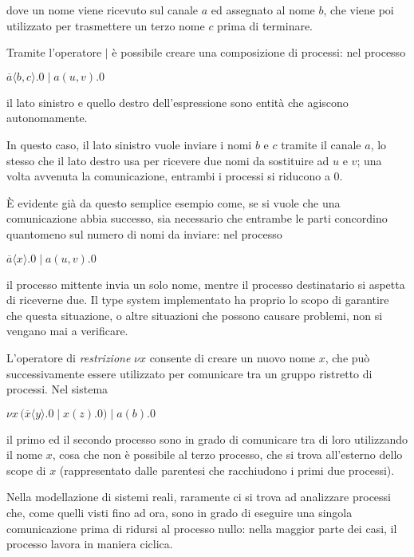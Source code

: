 dove un nome viene ricevuto sul canale $a$ ed assegnato al nome $b$, che
viene poi utilizzato per trasmettere un terzo nome $c$ prima di terminare.

Tramite l'operatore $|$ \`e possibile creare una composizione di processi:
nel processo

\begin{pilisting}
$
    \overline{a}\langle b,c\rangle.0 \; | \;
    a(u,v).0
$
\end{pilisting}

il lato sinistro e quello destro dell'espressione sono entit\`a che agiscono
autonomamente.

In questo caso, il lato sinistro vuole inviare i nomi $b$ e $c$ tramite il
canale $a$, lo stesso che il lato destro usa per ricevere due nomi da
sostituire ad $u$ e $v$; una volta avvenuta la comunicazione, entrambi i
processi si riducono a $0$.

\`E evidente gi\`a da questo semplice esempio come, se si vuole che una
comunicazione abbia successo, sia necessario che entrambe le parti
concordino quantomeno sul numero di nomi da inviare: nel processo

\begin{pilisting}
$
    \overline{a}\langle x\rangle.0 \; | \;
    a(u,v).0
$
\end{pilisting}

il processo mittente invia un solo nome, mentre il processo destinatario
si aspetta di riceverne due. Il type system implementato ha proprio lo
scopo di garantire che questa situazione, o altre situazioni che possono
causare problemi, non si vengano mai a verificare.

L'operatore di \emph{restrizione} $\nu x$ consente di creare un nuovo nome
$x$, che pu\`o successivamente essere utilizzato per comunicare tra un
gruppo ristretto di processi. Nel sistema

\begin{pilisting}
$
    \nu x \, (
      \overline{x}\langle y\rangle.0 \; | \;
      x(z).0
    ) \; | \;
    a(b).0
$
\end{pilisting}

il primo ed il secondo processo sono in grado di comunicare tra di loro
utilizzando il nome $x$, cosa che non \`e possibile al terzo processo, che
si trova all'esterno dello scope di $x$ (rappresentato dalle parentesi che
racchiudono i primi due processi).

Nella modellazione di sistemi reali, raramente ci si trova ad analizzare
processi che, come quelli visti fino ad ora, sono in grado di eseguire una
singola comunicazione prima di ridursi al processo nullo: nella maggior
parte dei casi, il processo lavora in maniera ciclica.


